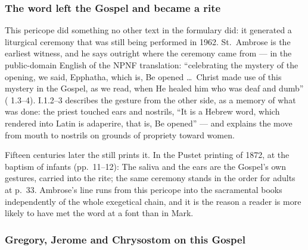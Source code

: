 \subsubsection*{The word left the Gospel and became a rite}

This pericope did something no other text in the formulary did: it generated a
liturgical ceremony that was still being performed in 1962. St.~Ambrose is the
earliest witness, and he says outright where the ceremony came from --- in the
public-domain English of the NPNF translation: ``celebrating the mystery of the
opening, we said, Epphatha, which is, Be opened \dots\ Christ made use of this
mystery in the Gospel, as we read, when He healed him who was deaf and dumb''
( 1.3--4).  I.1.2--3 describes the
gesture from the other side, as a memory of what was done: the priest touched
ears and nostrils, ``It is a Hebrew word, which rendered into Latin is
adaperire, that is, Be opened'' --- and explains the move from mouth to nostrils
on grounds of propriety toward women.

Fifteen centuries later the  still prints it. In the
Pustet printing of 1872, at the baptism of infants (pp.~11--12):  The saliva and
the ears are the Gospel's own gestures, carried into the rite; the same
ceremony stands in the order for adults at p.~33. Ambrose's line runs from this
pericope into the sacramental books independently of the whole exegetical
chain, and it is the reason a reader is more likely to have met the word
 at a font than in Mark.

\subsubsection*{Gregory, Jerome and Chrysostom on this Gospel}

